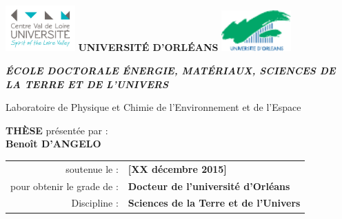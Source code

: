 {\parindent0pt %

\includegraphics[width=0.2\textwidth, valign=c]{./images/logos/pucvl}
\hfill
{\LARGE\textbf{UNIVERSITÉ D'ORLÉANS}}
\hfill
\includegraphics[width=0.2\textwidth, valign=c]{./images/logos/univ}

\begin{center}
	{\large\textit{\textbf{ÉCOLE DOCTORALE ÉNERGIE, MATÉRIAUX, SCIENCES DE LA TERRE ET DE L'UNIVERS}}}\\

	\vspace{1.1cm}

	{\large Laboratoire de Physique et Chimie de l'Environnement et de l'Espace} \\

	\vspace{1.1cm}

	{\Large\textbf{THÈSE}} présentée par :\\
	{\Large\textbf{Benoît D'ANGELO}}\\

	\vspace{1.1cm}

	\begin{tabular}{r l}
		soutenue le : & \textbf{[XX décembre 2015]} \\ [.8cm]
		pour obtenir le grade de : & \textbf{Docteur de l'universit\'e d'Orl\'eans}\\[.2cm]
		Discipline : &  \textbf{Sciences de la Terre et de l'Univers}\\
	\end{tabular}
\end{center}

}
